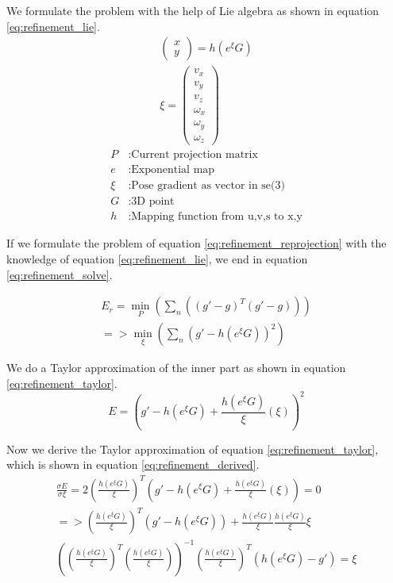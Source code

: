 \documentclass[11pt,a4paper,titlepage,oneside]{report}
\begin{document}
We formulate the problem with the help of Lie algebra as shown in equation \ref{eq:refinement_lie}.
\begin{equation}\label{eq:refinement_lie}
  \begin{gathered}
    \begin{pmatrix}
      x\\
      y
    \end{pmatrix}
    =h(e^{\xi}G)\\
    \xi=\begin{pmatrix}
      v_x\\
      v_y\\
      v_z\\
      \omega_x\\
      \omega_y\\
      \omega_z
    \end{pmatrix}
  \end{gathered}
\end{equation}
\begin{align*}
  P     &: \text{Current projection matrix}\\
  e     &: \text{Exponential map}\\
  \xi   &: \text{Pose gradient as vector in se(3)}\\
  G     &: \text{3D point}\\
  h     &: \text{Mapping function from u,v,s to x,y}
\end{align*}

If we formulate the problem of equation \ref{eq:refinement_reprojection} with the knowledge of equation \ref{eq:refinement_lie}, we end in equation \ref{eq:refinement_solve}.

\begin{equation}\label{eq:refinement_solve}
  \begin{gathered}
    E_r=\min_P(\sum_n ((g'-g)^T(g'-g)))\\
    =>\min_{\xi}(\sum_n (g'-h(e^{\xi}G))^2)
  \end{gathered}
\end{equation}

We do a Taylor approximation of the inner part as shown in equation \ref{eq:refinement_taylor}.
\begin{equation}\label{eq:refinement_taylor}
  E=(g'-h(e^{\xi}G)+\frac{h(e^{\xi}G)}{\xi}(\xi))^2
\end{equation}

Now we derive the Taylor approximation of equation \ref{eq:refinement_taylor}, which is shown in equation \ref{eq:refinement_derived}.
\begin{equation}\label{eq:refinement_derived}
  \begin{gathered}
    \frac{\sigma E}{\sigma \xi}=2(\frac{h(e^{\xi} G)}{\xi})^T (g'-h(e^{\xi} G)+\frac{h(e^{\xi} G)}{\xi}(\xi))=0\\
    =>(\frac{h(e^{\xi} G)}{\xi})^T(g'-h(e^{\xi} G))+\frac{h(e^{\xi} G)}{\xi}\frac{h(e^{\xi} G)}{\xi}\xi\\
    ((\frac{h(e^{\xi} G)}{\xi})^T(\frac{h(e^{\xi} G)}{\xi}))^{-1}(\frac{h(e^{\xi} G)}{\xi})^T(h(e^{\xi} G)-g')=\xi
  \end{gathered}
\end{equation}
\end{document}
